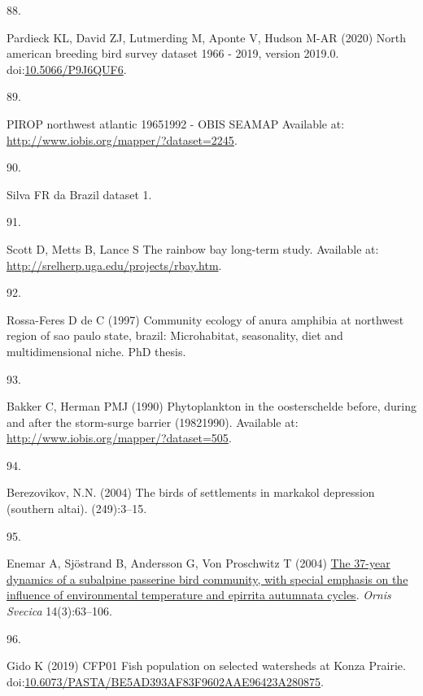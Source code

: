 \documentclass{article}
\newlength{\cslhangindent}
\newlength{\csllabelwidth}
\newlength{\cslentryspacingunit} %
\newenvironment{CSLReferences}[2] %
 {%
  \setlength{\parindent}{0pt}
  \ifodd #1
  \let\oldpar\par
  \def\par{\hangindent=\cslhangindent\oldpar}
  \fi
  \setlength{\parskip}{#2\cslentryspacingunit}
 }%
 {}
\newcommand{\CSLLeftMargin}[1]{\parbox[t]{\csllabelwidth}{#1}}
\newcommand{\CSLRightInline}[1]{\parbox[t]{\linewidth - \csllabelwidth}{#1}\break}
\begin{document}
\begin{CSLReferences}{0}{0}
\leavevmode{}%
\CSLLeftMargin{88. }%
\CSLRightInline{Pardieck KL, David ZJ, Lutmerding M, Aponte V, Hudson
M-AR (2020) North american breeding bird survey dataset 1966 - 2019,
version 2019.0.
doi:\href{https://doi.org/10.5066/P9J6QUF6}{10.5066/P9J6QUF6}.}

\leavevmode{}%
\CSLLeftMargin{89. }%
\CSLRightInline{PIROP northwest atlantic 1965{\textendash}1992 - OBIS
SEAMAP Available at: \url{http://www.iobis.org/mapper/?dataset=2245}.}

\leavevmode{}%
\CSLLeftMargin{90. }%
\CSLRightInline{Silva FR da Brazil dataset 1.}

\leavevmode{}%
\CSLLeftMargin{91. }%
\CSLRightInline{Scott D, Metts B, Lance S The rainbow bay long-term
study. Available at: \url{http://srelherp.uga.edu/projects/rbay.htm}.}

\leavevmode{}%
\CSLLeftMargin{92. }%
\CSLRightInline{Rossa-Feres D de C (1997) Community ecology of anura
amphibia at northwest region of sao paulo state, brazil: Microhabitat,
seasonality, diet and multidimensional niche. PhD thesis.}

\leavevmode{}%
\CSLLeftMargin{93. }%
\CSLRightInline{Bakker C, Herman PMJ (1990) Phytoplankton in the
oosterschelde before, during and after the storm-surge barrier
(1982{\textendash}1990). Available at:
\url{http://www.iobis.org/mapper/?dataset=505}.}

\leavevmode{}%
\CSLLeftMargin{94. }%
\CSLRightInline{Berezovikov, N.N. (2004) The birds of settlements in
markakol depression (southern altai). (249):3--15.}

\leavevmode{}%
\CSLLeftMargin{95. }%
\CSLRightInline{Enemar A, Sjöstrand B, Andersson G, Von Proschwitz T
(2004) \href{https://doi.org/10.34080/os.v14.20236}{The 37-year dynamics
of a subalpine passerine bird community, with special emphasis on the
influence of environmental temperature and epirrita autumnata cycles}.
\emph{Ornis Svecica} 14(3):63--106.}

\leavevmode{}%
\CSLLeftMargin{96. }%
\CSLRightInline{Gido K (2019) CFP01 Fish population on selected
watersheds at Konza Prairie.
doi:\href{https://doi.org/10.6073/PASTA/BE5AD393AF83F9602AAE96423A280875}{10.6073/PASTA/BE5AD393AF83F9602AAE96423A280875}.}


\end{CSLReferences}
\end{document}
